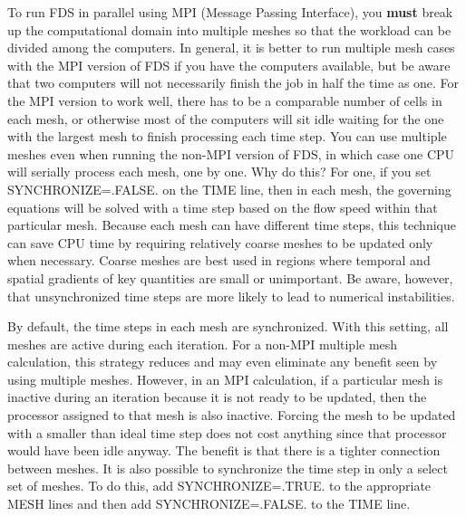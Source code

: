 \documentclass[11pt]{book}
\begin{document}
To run FDS in parallel using MPI (Message Passing Interface), you {\bf must} break up the computational domain into multiple meshes so that the workload can be divided among the computers. In general, it is better to run multiple mesh cases with the MPI version of FDS if you have the computers available, but be aware that two computers will not necessarily finish the job in half the time as one. For the MPI version to work well, there has to be a comparable number of cells in each mesh, or otherwise most of the computers will sit idle waiting for the one with the largest mesh to finish processing each time step. You can use multiple meshes even when running the non-MPI version of FDS, in which case one CPU will serially process each mesh, one by one. Why do this? For one, if you set {\ct SYNCHRONIZE=.FALSE.} on the {\ct TIME} line, then in each mesh, the governing equations will be solved with a time step based on the flow speed within that particular mesh. Because each mesh can have different time steps, this technique can save CPU time by requiring relatively coarse meshes to be updated only when necessary. Coarse meshes are best used in regions where temporal and spatial gradients of key quantities are small or unimportant. Be aware, however, that unsynchronized time steps are more likely to lead to numerical instabilities.

By default, the time steps in each mesh are synchronized. With this setting, all meshes are active during each iteration. For a non-MPI multiple mesh calculation, this strategy reduces and may even eliminate any benefit seen by using multiple meshes. However, in an MPI calculation, if a particular mesh is inactive during an iteration because it is not ready to be updated, then the processor assigned to that mesh is also inactive. Forcing the mesh to be updated with a smaller than ideal time step does not cost anything since that processor would have been idle anyway. The benefit is that there is a tighter connection between meshes. It is also possible to synchronize the time step in only a select set of meshes. To do this, add {\ct SYNCHRONIZE=.TRUE.} to the appropriate {\ct MESH} lines and then add {\ct SYNCHRONIZE=.FALSE.} to the {\ct TIME} line.
\end{document}
